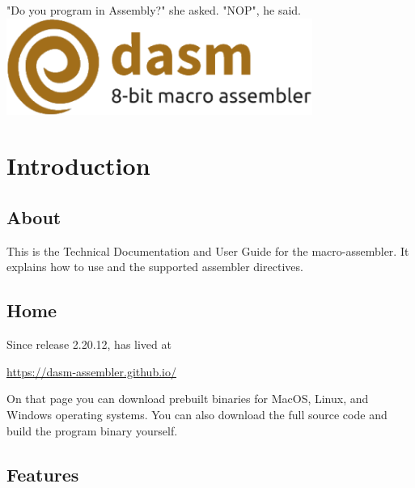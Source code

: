 \begin{savequote}
\sffamily
"Do you program in Assembly?" she asked.\newline
"NOP", he said.\\[0.5cm]



\includegraphics[width=0.75\textwidth]{dasm-logo.png}


\end{savequote}



\chapter{Introduction}



\section{About} 

This is the Technical Documentation and User Guide for the \dasm macro-assembler. It explains how
to use \dasm and the supported assembler directives.

\section{Home}

Since release 2.20.12, \dasm has lived at

\url{https://dasm-assembler.github.io/}

On that page you can download prebuilt binaries for MacOS, Linux, and Windows operating systems. You can also download the full source code and build the program binary yourself.


\section{Features}

